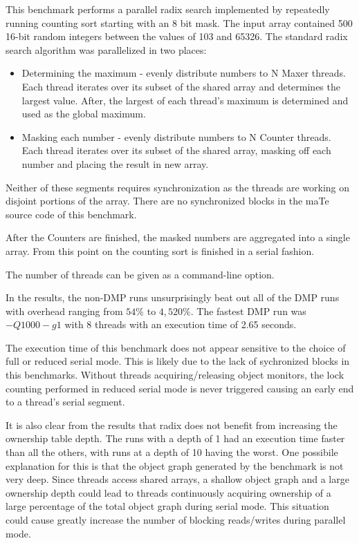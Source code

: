 This benchmark performs a parallel radix search implemented by
repeatedly running counting sort starting with an 8 bit mask.  The
input array contained 500 16-bit random integers between the values of
103 and 65326.  The standard radix search algorithm was parallelized
in two places:

\begin{itemize}
\item Determining the maximum - evenly distribute numbers to N Maxer
  threads.  Each thread iterates over its subset of the shared array
  and determines the largest value.  After, the largest of each
  thread's maximum is determined and used as the global maximum.

\item Masking each number - evenly distribute numbers to N Counter
  threads.  Each thread iterates over its subset of the shared array,
  masking off each number and placing the result in new array.
\end{itemize}

Neither of these segments requires synchronization as the threads are
working on disjoint portions of the array.  There are no synchronized
blocks in the maTe source code of this benchmark.

After the Counters are finished, the masked numbers are aggregated
into a single array.  From this point on the counting sort is finished
in a serial fashion.

The number of threads can be given as a command-line option.

In the results, the non-DMP runs unsurprisingly beat out all of the
DMP runs with overhead ranging from $54\%$ to $4,520\%$.  The fastest
DMP run was $-Q1000 -g1$ with 8 threads with an execution time of 2.65
seconds.

The execution time of this benchmark does not appear sensitive to the
choice of full or reduced serial mode.  This is likely due to the lack
of sychronized blocks in this benchmarks.  Without threads
acquiring/releasing object monitors, the lock counting performed in
reduced serial mode is never triggered causing an early end to a
thread's serial segment.

It is also clear from the results that radix does not benefit from
increasing the ownership table depth.  The runs with a depth of 1 had
an execution time faster than all the others, with runs at a depth of
10 having the worst.  One possibile explanation for this is that the
object graph generated by the benchmark is not very deep.  Since
threads access shared arrays, a shallow object graph and a large
ownership depth could lead to threads continuously acquiring ownership
of a large percentage of the total object graph during serial mode.
This situation could cause greatly increase the number of blocking
reads/writes during parallel mode.

